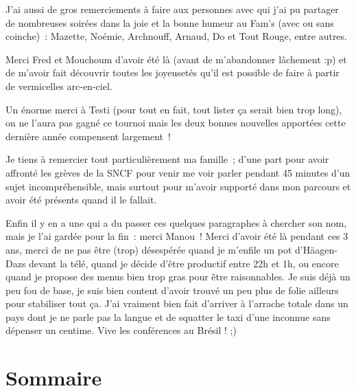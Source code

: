 J'ai aussi de gros remerciements à faire aux personnes avec qui j'ai pu partager de nombreuses soirées dans la joie et la bonne humeur au Fam's (avec ou sans coinche)~: Mazette, Noémie, Archnouff, Arnaud, Do et Tout Rouge, entre autres.

Merci Fred et Mouchoum d'avoir été là (avant de m'abandonner lâchement :p) et de m'avoir fait découvrir toutes les joyeusetés qu'il est possible de faire à partir de vermicelles arc-en-ciel.

Un énorme merci à Testi (pour tout en fait, tout lister ça serait bien trop long), on ne l'aura pas gagné ce tournoi mais les deux bonnes nouvelles apportées cette dernière année compensent largement~!


Je tiens à remercier tout particulièrement ma famille~; d'une part pour avoir affronté les grèves de la SNCF pour venir me voir parler pendant 45 minutes d'un sujet incompréhensible, mais surtout pour m'avoir supporté dans mon parcours et avoir été présents quand il le fallait.


Enfin il y en a une qui a du passer ces quelques paragraphes à chercher son nom, mais je l'ai gardée pour la fin~: merci Manou~!
Merci d'avoir été là pendant ces 3 ans, merci de ne pas être (trop) désespérée quand je m'enfile un pot d'Häagen-Dazs devant la télé, quand je décide d'être productif entre 22h et 1h, ou encore quand je propose des menus bien trop gras pour être raisonnables.
Je suis déjà un peu fou de base, je suis bien content d'avoir trouvé un peu plus de folie ailleurs pour stabiliser tout ça.
J'ai vraiment bien fait d'arriver à l'arrache totale dans un pays dont je ne parle pas la langue et de squatter le taxi d'une inconnue sans dépenser un centime.
Vive les conférences au Brésil ! ;)

\cleardoublepage
\dominitoc
\makeatletter
\renewcommand{\contentsname}{Sommaire}
\renewcommand{\tableofcontents}[1][\contentsname]{%
  \chapter*{#1}
}
\makeatother
\tableofcontents
